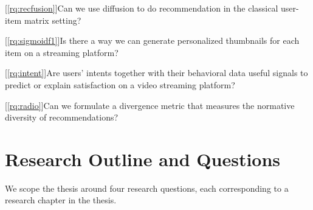 
[\ref{rq:recfusion}]{Can we use diffusion to do recommendation in the classical user-item matrix setting?}

[\ref{rq:sigmoidf1}]{Is there a way we can generate personalized thumbnails for each item on a streaming platform?}

[\ref{rq:intent}]{Are users' intents together with their behavioral data useful signals to predict or explain satisfaction on a video streaming platform?}

[\ref{rq:radio}]{Can we formulate a divergence metric that measures the normative diversity of recommendations?}

\section{Research Outline and Questions}
\label{section:introduction:rqs}


We scope the thesis around four research questions, each corresponding to a research chapter in the thesis.


